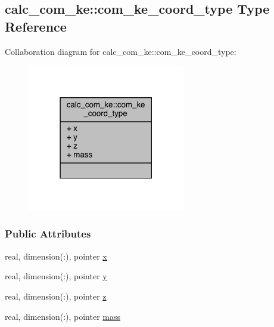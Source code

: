 \hypertarget{structcalc__com__ke_1_1com__ke__coord__type}{\subsection{calc\-\_\-com\-\_\-ke\-:\-:com\-\_\-ke\-\_\-coord\-\_\-type Type Reference}
\label{structcalc__com__ke_1_1com__ke__coord__type}
}


Collaboration diagram for calc\-\_\-com\-\_\-ke\-:\-:com\-\_\-ke\-\_\-coord\-\_\-type\-:
\nopagebreak
\begin{figure}[H]
\begin{center}
\leavevmode
\includegraphics[width=195pt]{structcalc__com__ke_1_1com__ke__coord__type__coll__graph}
\end{center}
\end{figure}
\subsubsection*{Public Attributes}
\begin{DoxyCompactItemize}
\item 
real, dimension(\-:), pointer \hyperlink{structcalc__com__ke_1_1com__ke__coord__type_a038f1fe69d7e2c95647d31bffe742230}{x}
\item 
real, dimension(\-:), pointer \hyperlink{structcalc__com__ke_1_1com__ke__coord__type_a2f813ec865f20acee148b3e564bc786e}{y}
\item 
real, dimension(\-:), pointer \hyperlink{structcalc__com__ke_1_1com__ke__coord__type_a4a39b0e8001030435d38ece2eb81fa3c}{z}
\item 
real, dimension(\-:), pointer \hyperlink{structcalc__com__ke_1_1com__ke__coord__type_adb7a38bb096e9e85ab86f97c9c58029a}{mass}
\end{DoxyCompactItemize}


